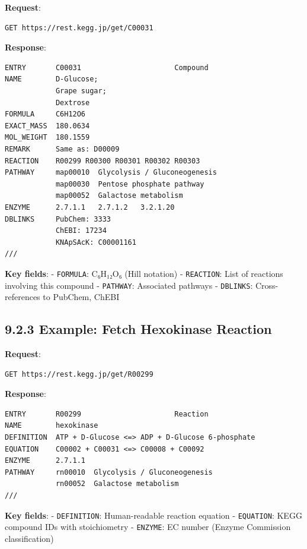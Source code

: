 \textbf{Request}:

\begin{lstlisting}
GET https://rest.kegg.jp/get/C00031
\end{lstlisting}

\textbf{Response}:

\begin{lstlisting}
ENTRY       C00031                      Compound
NAME        D-Glucose;
            Grape sugar;
            Dextrose
FORMULA     C6H12O6
EXACT_MASS  180.0634
MOL_WEIGHT  180.1559
REMARK      Same as: D00009
REACTION    R00299 R00300 R00301 R00302 R00303
PATHWAY     map00010  Glycolysis / Gluconeogenesis
            map00030  Pentose phosphate pathway
            map00052  Galactose metabolism
ENZYME      2.7.1.1   2.7.1.2   3.2.1.20
DBLINKS     PubChem: 3333
            ChEBI: 17234
            KNApSAcK: C00001161
///
\end{lstlisting}

\textbf{Key fields}: - \passthrough{\lstinline!FORMULA!}: C₆H₁₂O₆ (Hill
notation) - \passthrough{\lstinline!REACTION!}: List of reactions
involving this compound - \passthrough{\lstinline!PATHWAY!}: Associated
pathways - \passthrough{\lstinline!DBLINKS!}: Cross-references to
PubChem, ChEBI

\hypertarget{example-fetch-hexokinase-reaction}{%
\subsection{9.2.3 Example: Fetch Hexokinase
Reaction}\label{example-fetch-hexokinase-reaction}}

\textbf{Request}:

\begin{lstlisting}
GET https://rest.kegg.jp/get/R00299
\end{lstlisting}

\textbf{Response}:

\begin{lstlisting}
ENTRY       R00299                      Reaction
NAME        hexokinase
DEFINITION  ATP + D-Glucose <=> ADP + D-Glucose 6-phosphate
EQUATION    C00002 + C00031 <=> C00008 + C00092
ENZYME      2.7.1.1
PATHWAY     rn00010  Glycolysis / Gluconeogenesis
            rn00052  Galactose metabolism
///
\end{lstlisting}

\textbf{Key fields}: - \passthrough{\lstinline!DEFINITION!}:
Human-readable reaction equation - \passthrough{\lstinline!EQUATION!}:
KEGG compound IDs with stoichiometry - \passthrough{\lstinline!ENZYME!}:
EC number (Enzyme Commission classification)

